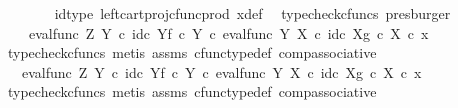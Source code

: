 \begin{isabellebody}
\ \ \ \ \ \ \isamarkupfalse%
\ id{\isacharunderscore}{\kern0pt}type\ left{\isacharunderscore}{\kern0pt}cart{\isacharunderscore}{\kern0pt}proj{\isacharunderscore}{\kern0pt}cfunc{\isacharunderscore}{\kern0pt}prod\ x{\isacharunderscore}{\kern0pt}def\ \isamarkupfalse%
\ {\isacharparenleft}{\kern0pt}typecheck{\isacharunderscore}{\kern0pt}cfuncs{\isacharcomma}{\kern0pt}\ presburger{\isacharparenright}{\kern0pt}\isanewline
\ \ \ \ \isamarkupfalse%
\ \isamarkupfalse%
\ {\isachardoublequoteopen}{\isachardot}{\kern0pt}{\isachardot}{\kern0pt}{\isachardot}{\kern0pt}\ {\isacharequal}{\kern0pt}\ \ {\isacharparenleft}{\kern0pt}eval{\isacharunderscore}{\kern0pt}func\ Z\ Y\ {\isasymcirc}\isactrlsub c\ {\isasymlangle}id\isactrlsub c\ Y{\isacharcomma}{\kern0pt}f\ {\isasymcirc}\isactrlsub c\ {\isasymbeta}\isactrlbsub Y\isactrlesub {\isasymrangle}{\isacharparenright}{\kern0pt}\ {\isasymcirc}\isactrlsub c\ eval{\isacharunderscore}{\kern0pt}func\ Y\ X\ {\isasymcirc}\isactrlsub c\ {\isasymlangle}id\isactrlsub c\ X{\isacharcomma}{\kern0pt}g\ {\isasymcirc}\isactrlsub c\ {\isasymbeta}\isactrlbsub X\isactrlesub {\isasymrangle}\ {\isasymcirc}\isactrlsub c\ x{\isachardoublequoteclose}\isanewline
\ \ \ \ \ \ \isamarkupfalse%
\ {\isacharparenleft}{\kern0pt}typecheck{\isacharunderscore}{\kern0pt}cfuncs{\isacharcomma}{\kern0pt}\ metis\ assms\ cfunc{\isacharunderscore}{\kern0pt}type{\isacharunderscore}{\kern0pt}def\ comp{\isacharunderscore}{\kern0pt}associative{\isacharparenright}{\kern0pt}\isanewline
\ \ \ \ \isamarkupfalse%
\ \isamarkupfalse%
\ {\isachardoublequoteopen}{\isachardot}{\kern0pt}{\isachardot}{\kern0pt}{\isachardot}{\kern0pt}\ {\isacharequal}{\kern0pt}\ eval{\isacharunderscore}{\kern0pt}func\ Z\ Y\ {\isasymcirc}\isactrlsub c\ {\isasymlangle}id\isactrlsub c\ Y{\isacharcomma}{\kern0pt}f\ {\isasymcirc}\isactrlsub c\ {\isasymbeta}\isactrlbsub Y\isactrlesub {\isasymrangle}\ {\isasymcirc}\isactrlsub c\ eval{\isacharunderscore}{\kern0pt}func\ Y\ X\ {\isasymcirc}\isactrlsub c\ {\isasymlangle}id\isactrlsub c\ X{\isacharcomma}{\kern0pt}g\ {\isasymcirc}\isactrlsub c\ {\isasymbeta}\isactrlbsub X\isactrlesub {\isasymrangle}\ {\isasymcirc}\isactrlsub c\ x{\isachardoublequoteclose}\isanewline
\ \ \ \ \ \ \isamarkupfalse%
\ {\isacharparenleft}{\kern0pt}typecheck{\isacharunderscore}{\kern0pt}cfuncs{\isacharcomma}{\kern0pt}\ metis\ assms\ cfunc{\isacharunderscore}{\kern0pt}type{\isacharunderscore}{\kern0pt}def\ comp{\isacharunderscore}{\kern0pt}associative{\isacharparenright}{\kern0pt}\isanewline

\end{isabellebody}
